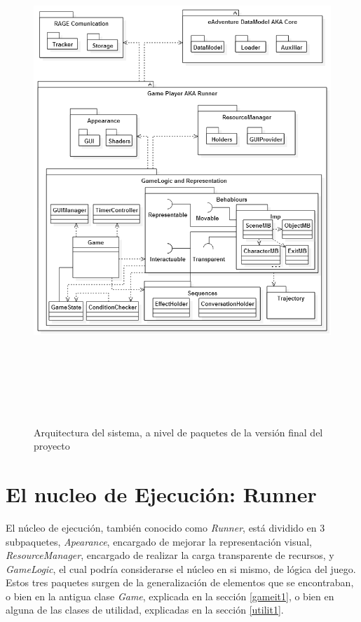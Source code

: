 \begin{figure}[h!]
	\centerline{\includegraphics[height=7.5in]{figures/it2/Arquitectura.png}}
	\caption[Arquitectura - Versión Final]{Arquitectura del sistema, a nivel de paquetes de la versión final del proyecto}
	\label{arquitecturait2}
\end{figure}

\newpage

\section{El nucleo de Ejecución: Runner}

El núcleo de ejecución, también conocido como \textit{Runner}, está dividido en 3 subpaquetes, \textit{Apearance}, encargado de mejorar la representación visual, \textit{ResourceManager}, encargado de realizar la carga transparente de recursos, y \textit{GameLogic}, el cual podría considerarse el núcleo en si mismo, de lógica del juego. Estos tres paquetes surgen de la generalización de elementos que se encontraban, o bien en la antigua clase \textit{Game}, explicada en la sección \ref{gameit1}, o bien en alguna de las clases de utilidad, explicadas en la sección \ref{utilit1}.

